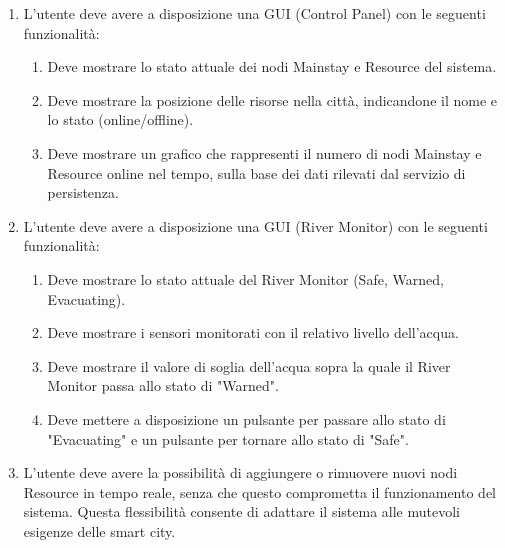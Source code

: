 \begin{enumerate}
    \item L'utente deve avere a disposizione una GUI (Control Panel) con le seguenti funzionalità:
          \begin{enumerate}
              \item Deve mostrare lo stato attuale dei nodi Mainstay e Resource del sistema.
              \item Deve mostrare la posizione delle risorse nella città, indicandone il nome e lo stato (online/offline).
              \item Deve mostrare un grafico che rappresenti il numero di nodi Mainstay e Resource online nel tempo, sulla base dei dati rilevati
                    dal servizio di persistenza.
          \end{enumerate}
    \item L'utente deve avere a disposizione una GUI (River Monitor) con le seguenti funzionalità:
          \begin{enumerate}
              \item Deve mostrare lo stato attuale del River Monitor (Safe, Warned, Evacuating).
              \item Deve mostrare i sensori monitorati con il relativo livello dell'acqua.
              \item Deve mostrare il valore di soglia dell'acqua sopra la quale il River Monitor passa allo stato di "Warned".
              \item Deve mettere a disposizione un pulsante per passare allo stato di "Evacuating" e un pulsante per tornare allo stato di "Safe".
          \end{enumerate}
    \item L'utente deve avere la possibilità di aggiungere o rimuovere nuovi nodi Resource in tempo reale, senza che questo comprometta il funzionamento del sistema. Questa flessibilità consente di adattare il sistema alle mutevoli esigenze delle smart city.
\end{enumerate}
